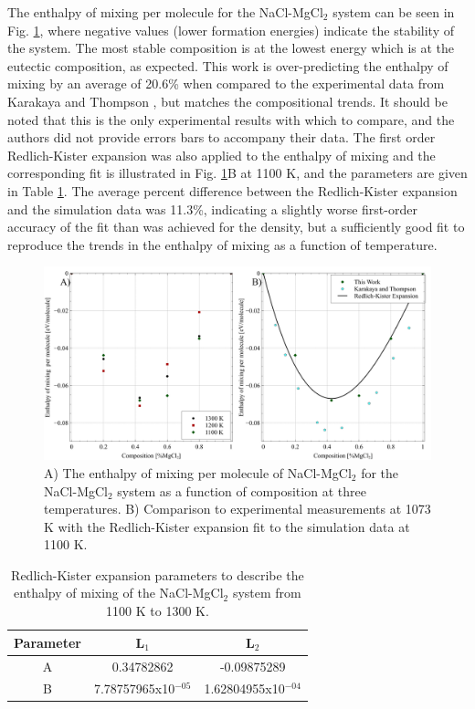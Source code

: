 \documentclass[review]{elsarticle}
\begin{document}
The enthalpy of mixing per molecule for the NaCl-MgCl$_2$ system can be seen in Fig. \ref{fig:enthalpy}, where negative values (lower formation energies) indicate the stability of the system. The most stable composition is at the lowest energy which is at the eutectic composition, as expected. This work is over-predicting the enthalpy of mixing by an average of 20.6\% when compared to the experimental data from Karakaya and Thompson \cite{karakaya1986thermodynamic}, but matches the compositional trends. It should be noted that this is the only experimental results with which to compare, and the authors did not provide errors bars to accompany their data. The first order Redlich-Kister expansion was also applied to the enthalpy of mixing and the corresponding fit is illustrated in Fig. \ref{fig:enthalpy}B at 1100 K, and the parameters are given in Table \ref{table:RK_en}. The average percent difference between the Redlich-Kister expansion and the simulation data was 11.3\%, indicating a slightly worse first-order accuracy of the fit than was achieved for the density, but a sufficiently good fit to reproduce the trends in the enthalpy of mixing as a function of temperature.

\begin{figure}[h]
 \centering
 \includegraphics[width=1.0\textwidth]{images/enthalpy.jpg} 
 \caption{A) The enthalpy of mixing per molecule of NaCl-MgCl$_{2}$ for the NaCl-MgCl$_{2}$ system as a function of composition at three temperatures. B) Comparison to experimental measurements at 1073 K \cite{karakaya1986thermodynamic} with the Redlich-Kister expansion fit to the simulation data at 1100 K.}
 \label{fig:enthalpy}
\end{figure} 

\begin{table}[]
\centering
\caption{Redlich-Kister expansion parameters to describe the enthalpy of mixing of the NaCl-MgCl$_2$ system from 1100 K to 1300 K.}
\begin{tabular}{|c|c|c|}
\hline
Parameter & L$_1$ & L$_2$ \\
\hline

A	& 0.34782862    & -0.09875289\\
B	  & 7.78757965x10$^{-05}$   & 1.62804955x10$^{-04}$\\
\hline
\end{tabular}
\label{table:RK_en}
\end{table}
\end{document}
